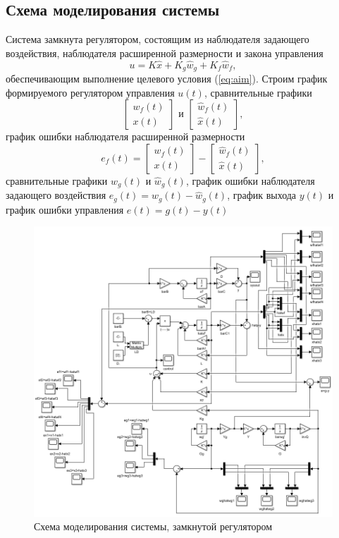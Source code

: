 \documentclass[a4paper, 12pt]{article}
\begin{document}
    \subsection{Схема моделирования системы}
    Система замкнута регулятором,
    состоящим из наблюдателя задающего воздействия,
    наблюдателя расширенной размерности
    и закона управления
    $$
    u=K\hat{x}+K_g\hat{w}_g+K_f\hat{w}_f,
    $$
    обеспечивающим выполнение целевого условия (\ref{eq:aim}).
    Строим график формируемого регулятором
    управления $u(t)$, сравнительные графики
    $$
    \begin{bmatrix}
        w_f(t)\\x(t)
    \end{bmatrix}\text{ и }\begin{bmatrix}
        \hat{w}_f(t)\\ \hat{x}(t)
    \end{bmatrix},
    $$
    график ошибки наблюдателя расширенной размерности
    $$
    e_f(t)=\begin{bmatrix}
        w_f(t)\\x(t)
    \end{bmatrix}-\begin{bmatrix}
        \hat{w}_f(t)\\ \hat{x}(t)
    \end{bmatrix},
    $$
    сравнительные графики $w_g(t)$ и $\hat{w}_g(t)$, график
    ошибки наблюдателя задающего воздействия $e_g(t)=w_g(t)-\hat{w}_g(t)$,
    график выхода $y(t)$ и график ошибки управления $e(t)=g(t)-y(t)$
    \begin{figure}[H]
        \centering
        \includegraphics[scale=0.75]{2task_scheme.png}
        \captionsetup{skip=0pt}
        \caption{Схема моделирования системы, замкнутой регулятором}
        \label{fig:2task_scheme}
    \end{figure}
\end{document}
